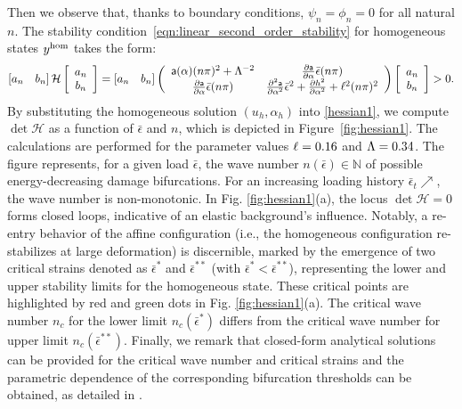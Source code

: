 \documentclass[10pt]{article}
\begin{document}
Then we observe that, thanks to boundary conditions, $\psi_{n}=\phi_{n}=0$ for all natural $n$. The stability condition~\eqref{eqn:linear_second_order_stability} {for homogeneous states $y^{\text{hom}}$} takes the form:
\begin{align}\left[ a_n \quad b_n \right] \mathcal{H} \left[ \begin{array}{c} a_n \\ b_n \end{array} \right]=\left[ a_n \quad b_n \right]\left(
    \begin{array}{cc}
            \mathsf{a}(\alpha)(n\pi)^2+\Lambda^{-2}                     & \frac{\partial \mathsf{a}}{\partial \alpha}\bar\epsilon(n\pi)                                                             \\
            \frac{\partial \mathsf{a}}{\partial \alpha}\bar\epsilon(n\pi) & \frac{\partial^2 \mathsf{a}}{\partial \alpha^2}\bar\epsilon^2+ \frac{\partial h^2}{\partial \alpha^2}+\ell^2(n\pi)^2 \\
        \end{array}
    \right)\left[ \begin{array}{c} a_n \\ b_n \end{array} \right]>0.\label{hessian1}\end{align}
%
By substituting the homogeneous solution $(u_h, \alpha_h)$ into \eqref{hessian1}, we compute $\det \mathcal{H}$ as a function of $\bar \epsilon$ and $n$, which is depicted in Figure~\ref{fig:hessian1}. The calculations are performed for the parameter values $\ell=0.16$ and $\Lambda=0.34$.
%
The figure represents, for a given load $\bar \epsilon$, the wave number $n(\bar \epsilon)\in \mathbb N$ of possible energy-decreasing damage bifurcations. For an increasing loading history $\bar \epsilon_t\nearrow$, the wave number is non-monotonic.
In Fig. \ref{fig:hessian1}(a), the locus $\det \mathcal H=0$ forms closed loops, indicative of an elastic background's influence. Notably, a re-entry behavior of the affine configuration  (i.e., the homogeneous configuration re-stabilizes at large deformation) is discernible, marked by the emergence of two critical strains denoted as $\bar\epsilon^*$ and $\bar\epsilon^{**}$ (with $\bar\epsilon^* < \bar\epsilon^{**}$), representing the lower and upper stability limits for the homogeneous state. These critical points are highlighted by red and green dots in Fig. \ref{fig:hessian1}(a). The critical wave number $n_c$ for the lower limit $n_c(\bar{\epsilon}^*)$    differs from the critical wave number for  upper limit $n_c(\bar{\epsilon}^{**})$. Finally, we remark that closed-form analytical solutions can be provided for the critical wave number and critical strains and the parametric dependence of the corresponding bifurcation thresholds can be obtained, as detailed in \cite{Salman2021-mn}.
\end{document}
